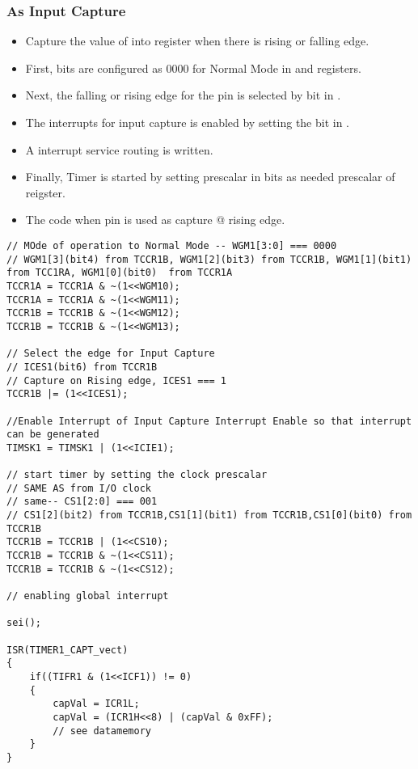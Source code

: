 \subsubsection{As Input Capture}
\begin{itemize}
    \item Capture the value of  into  register when there is rising or falling edge.
    \item First,  bits are configured as 0000 for Normal Mode in  and  registers.
    \item Next, the falling or rising edge for the  pin is selected by  bit in .
    \item The interrupts for input capture is enabled by setting the  bit in .
    \item A interrupt service routing is written.
    \item Finally, Timer is started by setting prescalar in  bits as needed prescalar of  reigster.
    \item The code when  pin is used as capture @ rising edge.
\end{itemize}
\begin{verbatim}
// MOde of operation to Normal Mode -- WGM1[3:0] === 0000
// WGM1[3](bit4) from TCCR1B, WGM1[2](bit3) from TCCR1B, WGM1[1](bit1)  from TCC1RA, WGM1[0](bit0)  from TCCR1A	
TCCR1A = TCCR1A & ~(1<<WGM10);
TCCR1A = TCCR1A & ~(1<<WGM11);
TCCR1B = TCCR1B & ~(1<<WGM12);
TCCR1B = TCCR1B & ~(1<<WGM13);

// Select the edge for Input Capture
// ICES1(bit6) from TCCR1B
// Capture on Rising edge, ICES1 === 1
TCCR1B |= (1<<ICES1);

//Enable Interrupt of Input Capture Interrupt Enable so that interrupt can be generated
TIMSK1 = TIMSK1 | (1<<ICIE1);
    
// start timer by setting the clock prescalar
// SAME AS from I/O clock
// same-- CS1[2:0] === 001
// CS1[2](bit2) from TCCR1B,CS1[1](bit1) from TCCR1B,CS1[0](bit0) from TCCR1B
TCCR1B = TCCR1B | (1<<CS10);
TCCR1B = TCCR1B & ~(1<<CS11);
TCCR1B = TCCR1B & ~(1<<CS12);

// enabling global interrupt

sei();

ISR(TIMER1_CAPT_vect)
{
	if((TIFR1 & (1<<ICF1)) != 0)
	{
		capVal = ICR1L;
		capVal = (ICR1H<<8) | (capVal & 0xFF);
		// see datamemory
	}
}
\end{verbatim}



